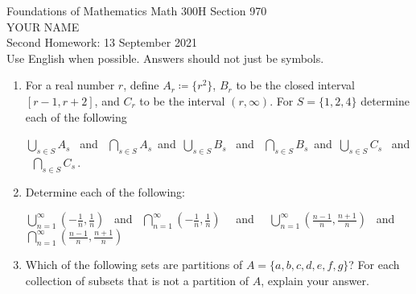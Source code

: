 \documentclass[12pt]{article}
\begin{document}
\LARGE 
\noindent
{\color{Maroon}Foundations of Mathematics \hfill Math 300H Section 970}\vspace{2pt}\\
\Large YOUR NAME\vspace{2pt}\\
\large
Second Homework: \hfill 13 September 2021\\
Use English when possible.  Answers should not just be symbols.
\normalsize\vspace{10pt}


\begin{enumerate}  %


\item  For a real number $r$, define $A_r\coloneqq\{r^2\}$,  $B_r$ to be the closed interval $[r{-}1, r{+}2]$, and $C_r$ to be the interval
  $(r,\infty)$.
  For $S=\{1,2,4\}$ determine each of the following 

  $\bigcup_{s\in S} A_s $ \ and \ $\bigcap_{s\in S} A_s $\ and\ 
  $\bigcup_{s\in S} B_s $ \ and \ $\bigcap_{s\in S} B_s $\ and\ 
  $\bigcup_{s\in S} C_s $ \ and \ $\bigcap_{s\in S} C_s $\,.


\item    Determine each of the  following:

  ${\displaystyle \bigcup_{n=1}^\infty \left(-\frac{1}{n},\frac{1}{n}\right)}$ \ and \ 
  ${\displaystyle \bigcap_{n=1}^\infty \left(-\frac{1}{n},\frac{1}{n}\right)}$ \ \ and \ \ 
  ${\displaystyle \bigcup_{n=1}^\infty \left(\frac{n{-}1}{n},\frac{n{+}1}{n}\right)}$ \ and \;\ 
  ${\displaystyle \bigcap_{n=1}^\infty \left(\frac{n{-}1}{n},\frac{n{+}1}{n}\right)}$
     

\item  Which of the following sets are partitions of $A=\{a,b,c,d,e,f,g\}$?
       For each collection of subsets that is not a partition of $A$, explain your answer.
  \begin{enumerate} 


\end{enumerate}
\end{enumerate}
\end{document}
